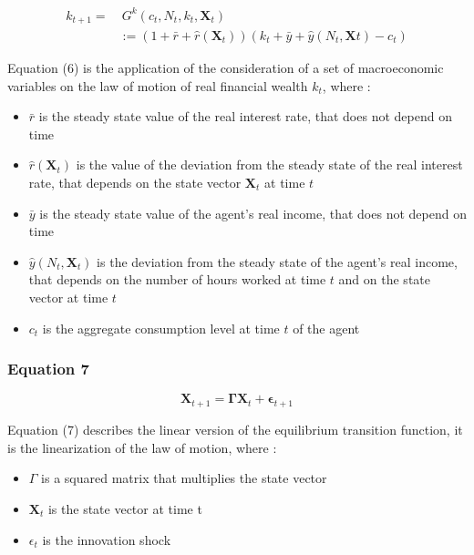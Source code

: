 \documentclass{article}
\begin{document}
\begin{equation}\tag{6}
    \begin{split}
        k_{t+1}= &\ G^{k}(c_{t},N_{t}, k_{t}, \bm{X}_{t}) \\ 
        & := (1+\bar{r}+\hat{r}(\bm{X}_{t}))(k_{t}+\bar{y}+\hat{y}(N_{t},\bm{X}t)-c_{t})
    \end{split}
\end{equation}

Equation (6) is the application of the consideration of a set of macroeconomic variables on the law of motion of real financial wealth $k_{t}$, where : 
\begin{itemize}
    \item $\bar{r}$ is the steady state value of the real interest rate, that does not depend on time
    \item $\hat{r}(\bm{X}_{t})$ is the value of the deviation from the steady state of the real interest rate, that depends on the state vector $\bm{X}_{t}$ at time $t$
    \item $\bar{y}$ is the steady state value of the agent's real income, that does not depend on time
    \item $\hat{y}(N_{t},\bm{X}_{t})$ is the deviation from the steady state of the agent's real income, that depends on the number of hours worked at time $t$ and on the state vector at time $t$
    \item $c_{t}$ is the aggregate consumption level at time $t$ of the agent
\end{itemize}

\subsubsection*{Equation 7}

\begin{equation}
    \bm{X}_{t+1}=\bm{\Gamma}\bm{X}_{t}+\bm{\epsilon}_{t+1}
\end{equation}

Equation (7) describes the linear version of the equilibrium transition function, it is the linearization of the law of motion, where :
\begin{itemize}
    \item $\Gamma$ is a squared matrix that multiplies the state vector
    \item $\bm{X}_t$ is the state vector at time t
    \item $\epsilon_{t}$ is the innovation shock
\end{itemize}
\end{document}
